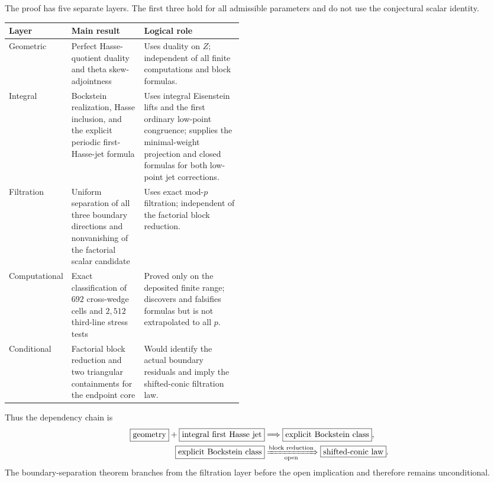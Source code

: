 The proof has five separate layers.  The first three hold for all admissible
parameters and do not use the conjectural scalar identity.

\begingroup
\renewcommand{\arraystretch}{1.16}
\small
\noindent\begin{tabularx}{\linewidth}{@{}>{\raggedright\arraybackslash}p{0.15\linewidth}>{\raggedright\arraybackslash}p{0.31\linewidth}>{\raggedright\arraybackslash}X@{}}
\toprule
Layer & Main result & Logical role\\
\midrule
Geometric & Perfect Hasse-quotient duality and theta skew-adjointness &
Uses duality on $Z$; independent of all finite computations and block
formulas.\\
Integral & Bockstein realization, Hasse inclusion, and the explicit
periodic first-Hasse-jet formula & Uses integral Eisenstein lifts and the
first ordinary low-point congruence; supplies the minimal-weight projection
and closed formulas for both low-point jet corrections.\\
Filtration & Uniform separation of all three boundary directions and
nonvanishing of the factorial scalar candidate & Uses exact mod-$p$
filtration; independent of the factorial block reduction.\\
Computational & Exact classification of $692$ cross-wedge cells and
$2{,}512$ third-line stress tests & Proved only on the deposited finite
range; discovers and falsifies formulas but is not extrapolated to all $p$.\\
Conditional & Factorial block reduction and two triangular containments for
the endpoint core & Would identify the actual boundary residuals and imply
the shifted-conic filtration law.\\
\bottomrule
\end{tabularx}
\endgroup

Thus the dependency chain is
\[
\begin{aligned}
 \boxed{\text{geometry}}+\boxed{\text{integral first Hasse jet}}
 &\Longrightarrow \boxed{\text{explicit Bockstein class}},\\
 \boxed{\text{explicit Bockstein class}}
 &\xRightarrow[\text{open}]{\text{block reduction}}
 \boxed{\text{shifted-conic law}}.
\end{aligned}
\]
The boundary-separation theorem branches from the filtration layer before
the open implication and therefore remains unconditional.
